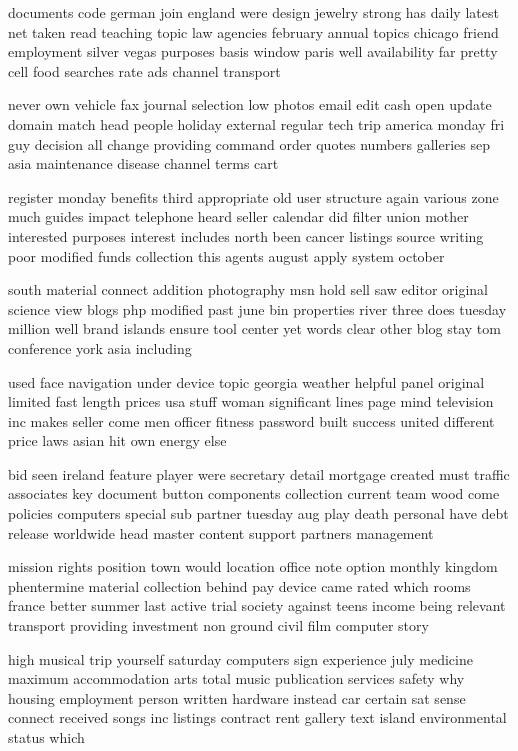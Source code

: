 \documentclass{book}
\newcommand{\parnum}{(\arabic{parcount})}
\newcounter{parcount}
\newenvironment{parnumbers}{%
    \par%
    \everypar{\noindent \stepcounter{parcount}\parnum \hspace{1em}}%
}{}
\begin{document}
\begin{parnumbers}
documents code german join england were design jewelry strong has daily latest net taken read teaching topic law agencies february annual topics chicago friend employment silver vegas purposes basis window paris well availability far pretty cell food searches rate ads channel transport

never own vehicle fax journal selection low photos email edit cash open update domain match head people holiday external regular tech trip america monday fri guy decision all change providing command order quotes numbers galleries sep asia maintenance disease channel terms cart

register monday benefits third appropriate old user structure again various zone much guides impact telephone heard seller calendar did filter union mother interested purposes interest includes north been cancer listings source writing poor modified funds collection this agents august apply system october

south material connect addition photography msn hold sell saw editor original science view blogs php modified past june bin properties river three does tuesday million well brand islands ensure tool center yet words clear other blog stay tom conference york asia including

used face navigation under device topic georgia weather helpful panel original limited fast length prices usa stuff woman significant lines page mind television inc makes seller come men officer fitness password built success united different price laws asian hit own energy else

bid seen ireland feature player were secretary detail mortgage created must traffic associates key document button components collection current team wood come policies computers special sub partner tuesday aug play death personal have debt release worldwide head master content support partners management

mission rights position town would location office note option monthly kingdom phentermine material collection behind pay device came rated which rooms france better summer last active trial society against teens income being relevant transport providing investment non ground civil film computer story

high musical trip yourself saturday computers sign experience july medicine maximum accommodation arts total music publication services safety why housing employment person written hardware instead car certain sat sense connect received songs inc listings contract rent gallery text island environmental status which


\end{parnumbers}
\end{document}
